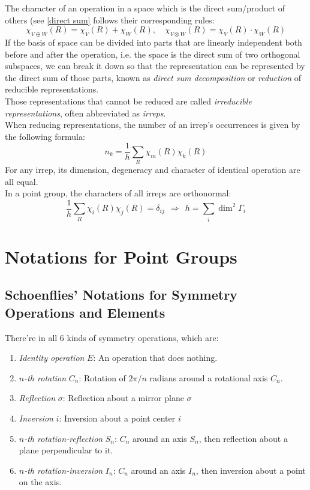		The character of an operation in a space which is the direct sum/product of others (see \ref{direct sum} follows their corresponding rules:
	    \[\chi_{V \oplus W}(R) = \chi_{V}(R) + \chi_{W}(R), \quad  \chi_{V \otimes W}(R) = \chi_{V}(R) \cdot \chi_{W}(R)\]	
		If the basis of space can be divided into parts that are linearly independent both before and after the operation, 
		i.e. the space is the direct sum of two orthogonal subspaces, 
		we can break it down so that the representation can be represented by the direct sum of those parts, 
		known as \emph{direct sum decomposition} or \emph{reduction} of reducible representations.\\
		Those representations that cannot be reduced are called \emph{irreducible representations}, often abbreviated as \emph{irreps}.\\
		When reducing representations, the number of an irrep's occurrences	is given by the following formula:
		\[\boxed{n_{k} = \frac{1}{h} \sum_{R} \chi_{m}(R) \chi_{k}(R)}\]\label{8.1.3}
		For any irrep, its dimension, degeneracy and character of identical operation are all equal.\\
		In a point group, the characters of all irreps are orthonormal:
		\[\frac{1}{h} \sum_{R} \chi_i(R) \chi_j(R) = \delta_{ij} \ \  \Rightarrow \ \  h = \sum_{i} \dim^2 \Gamma_i\]
		
\section{Notations for Point Groups}

	\subsection{Schoenflies' Notations for Symmetry Operations and Elements}
	
		There're in all 6 kinds of symmetry operations, which are:
	
		\begin{enumerate}
		
			\item \emph{Identity operation} $E$: An operation that does nothing.
			\item \emph{$n$-th rotation} $C_n$: Rotation of $2\pi/n$ radians around a rotational axis $C_n$. 
			\item \emph{Reflection} $\sigma$: Reflection about a mirror plane $\sigma$
			\item \emph{Inversion} $i$: Inversion about a point center $i$
			\item \emph{$n$-th rotation-reflection} $S_n$: $C_n$ around an axis $S_n$, then reflection about a plane perpendicular to it.
			\item \emph{$n$-th rotation-inversion} $I_n$: $C_n$ around an axis $I_n$, then inversion about a point on the axis.
			
		\end{enumerate}
		
